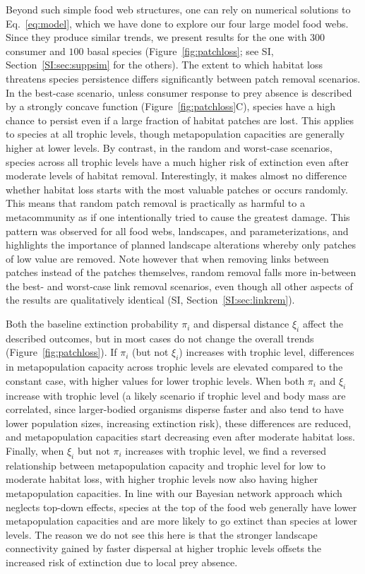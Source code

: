 \documentclass[11pt]{article}
\newcommand{\SI}{SI}
\begin{document}
Beyond such simple food web structures, one can rely on numerical solutions to Eq.~\ref{eq:model}, which we have done to explore our four large model food webs. Since they produce similar trends, we present results for the one with $300$ consumer and $100$ basal species (Figure~\ref{fig:patchloss}; see \SI, Section~\ref{SI:sec:suppsim} for the others). The extent to which habitat loss threatens species persistence differs significantly between patch removal scenarios. In the best-case scenario, unless consumer response to prey absence is described by a strongly concave function (Figure~\ref{fig:patchloss}C), species have a high chance to persist even if a large fraction of habitat patches are lost. This applies to species at all trophic levels, though metapopulation capacities are generally higher at lower levels. By contrast, in the random and worst-case scenarios, species across all trophic levels have a much higher risk of extinction even after moderate levels of habitat removal. Interestingly, it makes almost no difference whether habitat loss starts with the most valuable patches or occurs randomly. This means that random patch removal is practically as harmful to a metacommunity as if one intentionally tried to cause the greatest damage. This pattern was observed for all food webs, landscapes, and parameterizations, and highlights the importance of planned landscape alterations whereby only patches of low value are removed. Note however that when removing links between patches instead of the patches themselves, random removal falls more in-between the best- and worst-case link removal scenarios, even though all other aspects of the results are qualitatively identical (\SI, Section~\ref{SI:sec:linkrem}).

Both the baseline extinction probability $\pi_i$ and dispersal distance $\xi_i$ affect the described outcomes, but in most cases do not change the overall trends (Figure~\ref{fig:patchloss}). If $\pi_i$ (but not $\xi_i$) increases with trophic level, differences in metapopulation capacity across trophic levels are elevated compared to the constant case, with higher values for lower trophic levels. When both $\pi_i$ and $\xi_i$ increase with trophic level (a likely scenario if trophic level and body mass are correlated, since larger-bodied organisms disperse faster and also tend to have lower population sizes, increasing extinction risk), these differences are reduced, and metapopulation capacities start decreasing even after moderate habitat loss. Finally, when $\xi_i$ but not $\pi_i$ increases with trophic level, we find a reversed relationship between metapopulation capacity and trophic level for low to moderate habitat loss, with higher trophic levels now also having higher metapopulation capacities. In line with our Bayesian network approach which neglects top-down effects, species at the top of the food web generally have lower metapopulation capacities and are more likely to go extinct than species at lower levels. The reason we do not see this here is that the stronger landscape connectivity gained by faster dispersal at higher trophic levels offsets the increased risk of extinction due to local prey absence.
\end{document}
